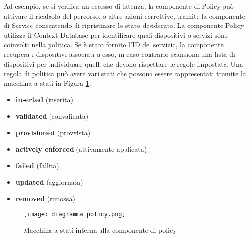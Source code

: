 Ad esempio, se si verifica un eccesso di latenza, la componente di Policy può attivare il ricalcolo del percorso, o altre azioni correttive, tramite la componente di Service
consentendo di ripristinare lo stato desiderato.
\newline La componente Policy utilizza il Context Database per identificare quali dispositivi o servizi sono coinvolti nella politica.
Se è stato fornito l'ID del servizio, la componente recupera i dispositivi associati a esso, in caso contrario scansiona una lista di dispositivi per individuare quelli che devono rispettare le regole impostate. 
\newline Una regola di politica può avere vari stati che possono essere rappresentati tramite la macchina a stati in Figura \ref{fig:diagramma}:
\begin{itemize}
    \item \textbf{inserted} (inserita)
    \item \textbf{validated} (convalidata)
    \item \textbf{provisioned} (provvista)
    \item \textbf{actively enforced} (attivamente applicata)
    \item \textbf{failed} (fallita)
    \item \textbf{updated} (aggiornata)
    \item \textbf{removed} (rimossa)
\end{itemize}
\begin{figure}[h]
    \centering
   \texttt{[image: diagramma policy.png]}
    \caption{Macchina a stati interna alla componente di policy \cite{D32}}
    \label{fig:diagramma}
\end{figure}
